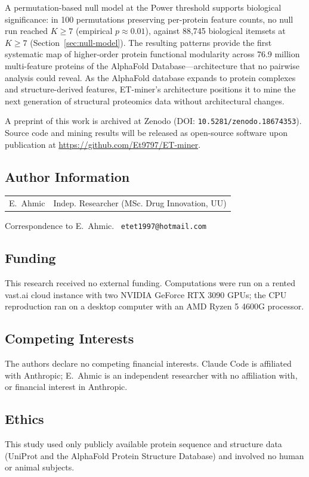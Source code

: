 \documentclass[10pt,a4paper,twocolumn]{article}
\begin{document}
A permutation-based null model at the Power threshold supports biological significance: in 100 permutations preserving per-protein feature counts, no null run reached $K{\geq}7$ (empirical $p{\approx}0.01$), against 88,745 biological itemsets at $K{\geq}7$ (Section~\ref{sec:null-model}). The resulting patterns provide the first systematic map of higher-order protein functional modularity across 76.9 million multi-feature proteins of the AlphaFold Database---architecture that no pairwise analysis could reveal. As the AlphaFold database expands to protein complexes and structure-derived features, ET-miner's architecture positions it to mine the next generation of structural proteomics data without architectural changes.

A preprint of this work is archived at Zenodo (DOI: \texttt{10.5281/zenodo.18674353}). Source code and mining results will be released as open-source software upon publication at \url{https://github.com/Et9797/ET-miner}.

\subsection*{Author Information}
\small
\begin{tabular}{@{}ll@{}}
E.\ Ahmic & Indep. Researcher (MSc. Drug Innovation, UU) \\
\end{tabular}

\smallskip
\noindent Correspondence to E.\ Ahmic. \ \texttt{etet1997@hotmail.com}
\normalsize

\subsection*{Funding}
\small
\noindent This research received no external funding. Computations were run on a rented vast.ai cloud instance with two NVIDIA GeForce RTX 3090 GPUs; the CPU reproduction ran on a desktop computer with an AMD Ryzen 5 4600G processor.
\normalsize

\subsection*{Competing Interests}
\small
\noindent The authors declare no competing financial interests. Claude Code is affiliated with Anthropic; E.\ Ahmic is an independent researcher with no affiliation with, or financial interest in Anthropic.
\normalsize

\subsection*{Ethics}
\small
\noindent This study used only publicly available protein sequence and structure data (UniProt and the AlphaFold Protein Structure Database) and involved no human or animal subjects.
\normalsize
\end{document}
